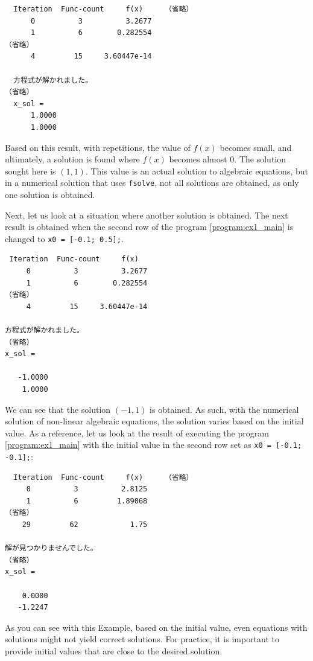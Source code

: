 \documentclass[tombow,dvipdfmx]{corona-a5-1.1}
\begin{document}
\begin{例}
\smallskip
\begin{実行結果}
\begin{verbatim}
  Iteration  Func-count     f(x)     （省略）
      0          3          3.2677
      1          6        0.282554
（省略）
      4         15     3.60447e-14

  方程式が解かれました。
（省略）
  x_sol =
      1.0000
      1.0000
\end{verbatim}
\end{実行結果}

Based on this result, with repetitions, the value of $f(x)$ becomes small, and ultimately, a solution is found where $f(x)$ becomes almost 0.
The solution sought here is $(1, 1)$. This value is an actual solution to algebraic equations, but in a numerical solution that uses \verb|fsolve|, not all solutions are obtained, as only one solution is obtained.

Next, let us look at a situation where another solution is obtained.
The next result is obtained when the second row of the program \nobreak\ref{program:ex1_main} is changed to \verb|x0 = [-0.1; 0.5];|.

\smallskip
\begin{実行結果}
\begin{verbatim}
 Iteration  Func-count     f(x)   
     0          3          3.2677
     1          6        0.282554
（省略）
     4         15     3.60447e-14

方程式が解かれました。
（省略）
x_sol =

   -1.0000
    1.0000
\end{verbatim}
\end{実行結果}

We can see that the solution $(-1, 1)$ is obtained.
As such, with the numerical solution of non-linear algebraic equations, the solution varies based on the initial value.
As a reference, let us look at the result of executing the program \nobreak\ref{program:ex1_main} with the initial value in the second row set as \verb|x0 = [-0.1; -0.1];|:

\smallskip
\begin{実行結果}
    \begin{verbatim}
  Iteration  Func-count     f(x)     （省略）
     0          3          2.8125
     1          6         1.89068
（省略）
    29         62            1.75

解が見つかりませんでした。
（省略）
x_sol =

    0.0000
   -1.2247
\end{verbatim}
\end{実行結果}

As you can see with this Example, based on the initial value, even equations with solutions might not yield correct solutions.
For practice, it is important to provide initial values that are close to the desired solution.
\end{例}
\end{document}
